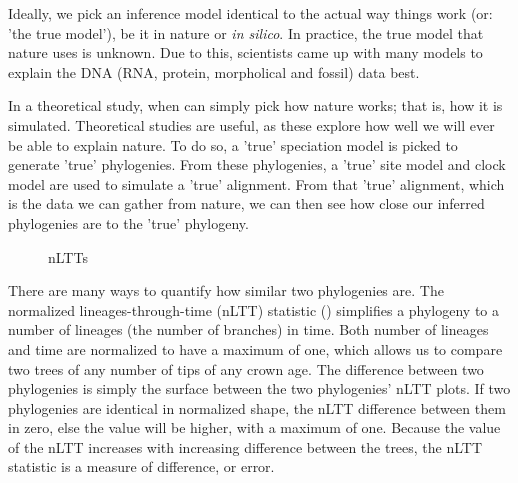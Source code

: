Ideally, we pick an inference model identical to the actual way things 
work (or: 'the true model'), be it in nature
or \textit{in silico}. In practice, the true model that nature uses is unknown.
Due to this, scientists came up with many models to explain the 
DNA (RNA, protein, morpholical and fossil) data best.

In a theoretical study, when can simply pick how nature works; that is,
how it is simulated. Theoretical studies are useful, as these explore
how well we will ever be able to explain nature. To do so, a 'true' 
speciation model is picked to generate 'true' phylogenies. 
From these phylogenies, a 'true' site model and clock model are used to
simulate a 'true' alignment. From that 'true' alignment, which is the
data we can gather from nature, we can then see how close our inferred
phylogenies are to the 'true' phylogeny.

\begin{figure}[H]
  \centering
  \caption{
    nLTTs
  }
  \label{fig:nltts}
\end{figure}

There are many ways to quantify how similar two phylogenies are. 
The normalized lineages-through-time (nLTT) statistic (\cite{janzen2015approximate}) simplifies
a phylogeny to a number of lineages (the number of branches) in time.
Both number of lineages and time are normalized to have a maximum of one,
which allows us to compare two trees of any number of tips of any crown age.
The difference between two phylogenies is simply the surface between the
two phylogenies' nLTT plots. If two phylogenies are identical in 
normalized shape, the nLTT difference between them in zero, else the
value will be higher, with a maximum of one. Because the value of the 
nLTT increases with increasing difference between the trees, the nLTT statistic
is a measure of difference, or error. 

